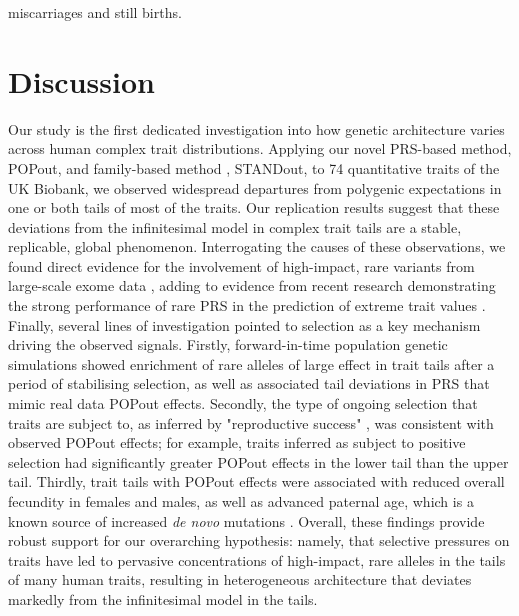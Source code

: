 \documentclass[12pt]{zHenriquesLab-StyleBioRxiv}
\begin{document}
{{miscarriages and still births.
% 
% 
% 
% 
% 
% 
% 
% 
% 
% 
% 
% 
% 
% 
% 
% 
% 
% 
% 
% 
% 
% 
% 
% 
% 
% 
% 
% 
% 
% 
% 
% 
% 
% 
% 
% 
% 
% 
% 
% 
% 
% 
% 
% 
% 
% 
% 
% 
% 
% 
\FloatBarrier
\section*{Discussion} \label{sec:discussion} 
Our study is the first dedicated investigation into how genetic architecture 
varies across human complex trait distributions. Applying our novel 
PRS-based method, POPout, and family-based method \cite{Souaiaia2024}, STANDout, 
to 74 quantitative traits of the UK Biobank, we observed widespread 
departures from polygenic expectations in one or both tails of most of the traits. 
Our replication results suggest that these deviations from the infinitesimal model 
in complex trait tails are a stable, replicable, global phenomenon. Interrogating 
the causes of these observations, we found direct evidence for the involvement of 
high-impact, rare variants from large-scale exome data \cite{Backman2021}, 
adding to evidence from recent research demonstrating the strong performance 
of rare PRS in the prediction of extreme trait values \cite{Fiziev2023}. 
Finally, several lines of investigation pointed to selection 
as a key mechanism driving the observed signals. Firstly, forward-in-time population 
genetic simulations \cite{BC_2019} showed enrichment of rare alleles of large effect in trait tails 
after a period of stabilising selection, as well as associated tail deviations
in PRS that mimic real data POPout effects. Secondly, the type of ongoing selection that 
traits are subject to, as inferred by "reproductive success" \cite{Sanjak2018}, was consistent with 
observed POPout effects; for example, traits inferred as subject to positive selection 
had significantly greater POPout effects in the lower tail than the upper tail. Thirdly, trait 
tails with POPout effects were associated with reduced overall fecundity in 
females and males, as well as advanced paternal age, which is a known source of 
increased \emph{de novo} mutations \cite{Kong2012}. Overall, these findings provide robust support for 
our overarching hypothesis: namely, that selective pressures on traits have led to 
pervasive concentrations of high-impact, rare alleles in the tails of many human traits, 
resulting in heterogeneous architecture that deviates markedly from the infinitesimal model \cite{Barton2017} in the tails.

}}
\end{document}
